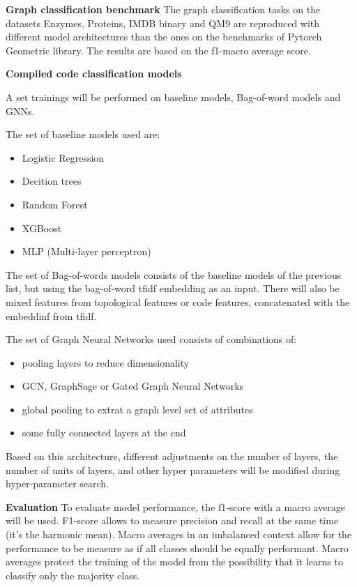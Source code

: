 \textbf{Graph classification benchmark}
The graph classification tasks on the datasets Enzymes, Proteins, IMDB binary and QM9 are reproduced with different model architectures than the ones on the benchmarks of Pytorch Geometric library. The results are based on the f1-macro average score.




\textbf{Compiled code classification models}


A set trainings will be performed on baseline models, Bag-of-word models and GNNs.

The set of baseline models used are:
\begin{itemize}
	\item Logistic Regression
	\item Decition trees
	\item Random Forest
	\item XGBoost
	\item MLP (Multi-layer perceptron)
\end{itemize}

The set of Bag-of-words models consists of the baseline models of the previous list, but using the bag-of-word tfidf embedding as an input. There will also be mixed features from topological features or code features, concatenated with the embeddinf from tfidf.

The set of Graph Neural Networks used consists of combinations of:
\begin{itemize}
	\item pooling layers to reduce dimensionality
	\item GCN, GraphSage or Gated Graph Neural Networks
	\item global pooling to extrat a graph level set of attributes
	\item some fully connected layers at the end
\end{itemize}

Based on this architecture, different adjustments on the number of layers, the number of units of layers, and other hyper parameters will be modified during hyper-parameter search.



\textbf{Evaluation}
To evaluate model performance, the f1-score with a macro average will be used. F1-score allows to measure precision and recall at the same time (it's the harmonic mean). Macro averages in an imbalanced context allow for the performance to be measure as if all classes should be equally performant. Macro averages protect the training of the model from the possibility that it learns to classify only the majority class.